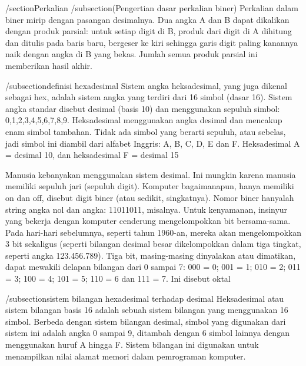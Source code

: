 /section{Perkalian}
/subsection(Pengertian dasar perkalian biner)
Perkalian dalam biner mirip dengan pasangan desimalnya. Dua angka A dan B dapat dikalikan dengan produk parsial: 
untuk setiap digit di B, produk dari digit di A dihitung dan ditulis pada baris baru, bergeser ke kiri sehingga 
garis digit paling kanannya naik dengan angka di B yang bekas. Jumlah semua produk parsial ini memberikan hasil akhir.

/subsection{definisi hexadesimal}
Sistem angka heksadesimal, yang juga dikenal sebagai hex, adalah sistem angka yang terdiri dari 16 simbol (dasar 16). 
Sistem angka standar disebut desimal (basis 10) dan menggunakan sepuluh simbol: 0,1,2,3,4,5,6,7,8,9. Heksadesimal 
menggunakan angka desimal dan mencakup enam simbol tambahan. Tidak ada simbol yang berarti sepuluh, atau sebelas, 
jadi simbol ini diambil dari alfabet Inggris: A, B, C, D, E dan F. Heksadesimal A = desimal 10, dan heksadesimal F = desimal 15

Manusia kebanyakan menggunakan sistem desimal. Ini mungkin karena manusia memiliki sepuluh jari (sepuluh digit). 
Komputer bagaimanapun, hanya memiliki on dan off, disebut digit biner (atau sedikit, singkatnya). Nomor biner 
hanyalah string angka nol dan angka: 11011011, misalnya. Untuk kenyamanan, insinyur yang bekerja dengan komputer 
cenderung mengelompokkan bit bersama-sama. Pada hari-hari sebelumnya, seperti tahun 1960-an, mereka akan mengelompokkan 
3 bit sekaligus (seperti bilangan desimal besar dikelompokkan dalam tiga tingkat, seperti angka 123.456.789). Tiga bit, 
masing-masing dinyalakan atau dimatikan, dapat mewakili delapan bilangan dari 0 sampai 7: 000 = 0; 001 = 1; 010 = 2;
011 = 3; 100 = 4; 101 = 5; 110 = 6 dan 111 = 7. Ini disebut oktal

/subsection{sistem bilangan hexadesimal terhadap desimal}
Heksadesimal atau sistem bilangan basis 16 adalah sebuah sistem bilangan yang menggunakan 16 simbol. Berbeda dengan sistem bilangan desimal, simbol yang digunakan dari sistem ini adalah angka 0 sampai 9, ditambah dengan 6 simbol lainnya dengan menggunakan huruf A hingga F. Sistem bilangan ini digunakan untuk menampilkan nilai alamat memori dalam pemrograman komputer.

